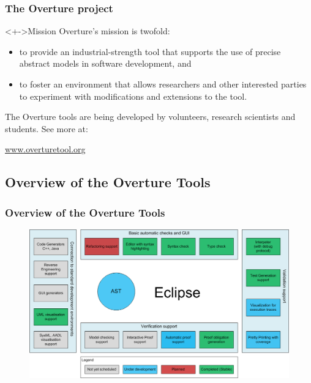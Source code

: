 \frame
{
  \frametitle{The Overture project}

\begin{block}<+->{Mission}
	Overture's mission is twofold: 
  \begin{itemize}
  		\item to provide an industrial-strength tool that supports the use of precise abstract models in software development, and 
  		\item to foster an environment that allows researchers and other interested parties to experiment with modifications and extensions to the tool.      

  \end{itemize}
\end{block}

The Overture tools are being developed by volunteers, research scientists and students. See more at:
\begin{center}
\href{www.overturetool.org}{www.overturetool.org}
\end{center}

}


\subsection{Overview of the Overture Tools}
\frame
{
  \frametitle{Overview of the Overture Tools}

\begin{figure}[t]
\centering
\includegraphics[width=\textwidth]{images/OvertureOverview}
\label{fig:}
\end{figure}

}


